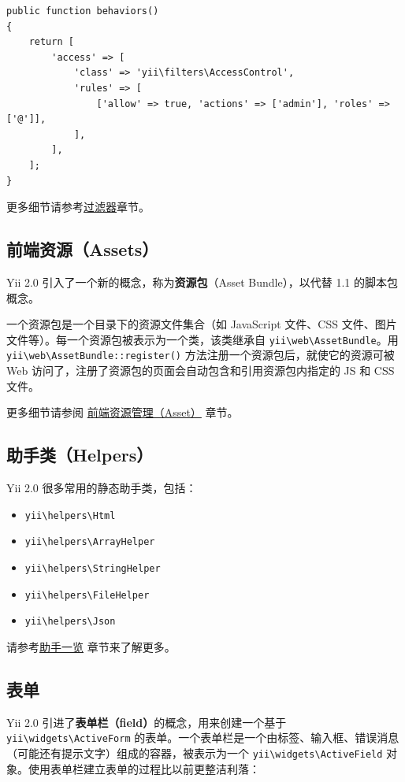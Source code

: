 \lstset{language=php}\begin{lstlisting}
public function behaviors()
{
    return [
        'access' => [
            'class' => 'yii\filters\AccessControl',
            'rules' => [
                ['allow' => true, 'actions' => ['admin'], 'roles' => ['@']],
            ],
        ],
    ];
}
\end{lstlisting}
更多细节请参考\hyperref[structure-filters.md]{过滤器}章节。

\subsection{前端资源（Assets）}
Yii 2.0 引入了一个新的概念，称为\textbf{资源包}（Asset Bundle），以代替 1.1 的脚本包概念。

一个资源包是一个目录下的资源文件集合（如 JavaScript 文件、CSS 文件、图片文件等）。每一个资源包被表示为一个类，该类继承自 \texttt{yii{\allowbreak{}\textbackslash}web{\allowbreak{}\textbackslash}AssetBundle}。用 \texttt{yii{\allowbreak{}\textbackslash}web{\allowbreak{}\textbackslash}AssetBundle\allowbreak{}::\allowbreak{}register()} 方法注册一个资源包后，就使它的资源可被 Web 访问了，注册了资源包的页面会自动包含和引用资源包内指定的 JS 和 CSS 文件。

更多细节请参阅 \hyperref[structure-assets.md]{前端资源管理（Asset）} 章节。

\subsection{助手类（Helpers）}
Yii 2.0 很多常用的静态助手类，包括：

\begin{itemize}
\item \texttt{yii{\allowbreak{}\textbackslash}helpers{\allowbreak{}\textbackslash}Html}
\item \texttt{yii{\allowbreak{}\textbackslash}helpers{\allowbreak{}\textbackslash}ArrayHelper}
\item \texttt{yii{\allowbreak{}\textbackslash}helpers{\allowbreak{}\textbackslash}StringHelper}
\item \texttt{yii{\allowbreak{}\textbackslash}helpers{\allowbreak{}\textbackslash}FileHelper}
\item \texttt{yii{\allowbreak{}\textbackslash}helpers{\allowbreak{}\textbackslash}Json}
\end{itemize}
请参考\hyperref[helper-overview.md]{助手一览} 章节来了解更多。

\subsection{表单}
Yii 2.0 引进了\textbf{表单栏（field）}的概念，用来创建一个基于 \texttt{yii{\allowbreak{}\textbackslash}widgets{\allowbreak{}\textbackslash}ActiveForm} 的表单。一个表单栏是一个由标签、输入框、错误消息（可能还有提示文字）组成的容器，被表示为一个 \texttt{yii{\allowbreak{}\textbackslash}widgets{\allowbreak{}\textbackslash}ActiveField} 对象。使用表单栏建立表单的过程比以前更整洁利落：

